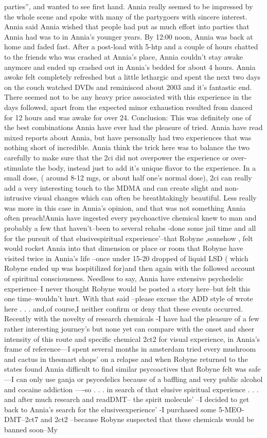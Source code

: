 \documentclass[12pt]{book}
\begin{document}
parties'', and wanted to see first hand. Annia really seemed to be impressed by the whole scene and spoke with many of the partygoers with sincere interest. Annia said Annia wished that people had put as much effort into parties that Annia had was to in Annia's younger years. By 12:00 noon, Annia was back at home and faded fast. After a post-load with 5-htp and a couple of hours chatted to the friends who was crashed at Annia's place, Annia couldn't stay awake anymore and ended up crashed out in Annia's bedded for about 4 hours. Annia awoke felt completely refreshed but a little lethargic and spent the next two days on the couch watched DVDs and reminisced about 2003 and it's fantastic end. There seemed not to be any heavy price associated with this experience in the days followed, apart from the expected minor exhaustion resulted from danced for 12 hours and was awake for over 24. Conclusion: This was definitely one of the best combinations Annia have ever had the pleasure of tried. Annia have read mixed reports about Annia, but have personally had two experiences that was nothing short of incredible. Annia think the trick here was to balance the two carefully to make sure that the 2ci did not overpower the experience or over-stimulate the body, instead just to add it's unique flavor to the experience. In a small dose, ( around 8-12 mgs, or about half one's normal dose), 2ci can really add a very interesting touch to the MDMA and can create slight and non-intrusive visual changes which can often be breathtakingly beautiful. Less really was more in this case in Annia's opinion, and that was not something Annia often preach!Annia have ingested every psychoactive chemical knew to man and probably a few that haven't--been to several rehabs -done some jail time and all for the pursuit of that elusivespiritual experience'--that Robyne ,somehow , felt would rocket Annia into that dimension or place or room that Robyne have visited twice in Annia's life --once under 15-20 dropped of liquid LSD ( which Robyne ended up was hospitilized for)and then again with the followed account of spiritual consciousness. Needless to say, Annia have extensive psychedelic experience--I never thought Robyne would be posted a story here--but felt this one time--wouldn't hurt. With that said --please excuse the ADD style of wrote here . . .  and,of course,I neither confirm or deny that these events occurred. Recently with the novelty of research chemicals -I have had the pleasure of a few rather interesting journey's but none yet can compare with the onset and sheer intensity of this route and specific chemical 2ct2 for visual experience, in Annia's frame of reference---I spent several months in amsterdam tried every mushroom and cactus in thesmart shops' on a relapse and when Robyne returned to the states found Annia difficult to find similar psycoactives that Robyne felt was safe---I can only use ganja or psycedelics because of a baffling and very public alcohol and cocaine addiction ----so . . .  in search of that elusive spiritual experience  . . .  and after much research and readDMT-- the spirit molecule' --I decided to get back to Annia's search for the elusiveexperience' -I purchased some 5-MEO-DMT--2ct7 and 2ct2 --because Robyne suspected that these chemicals would be banned soon--My 
\end{document}
